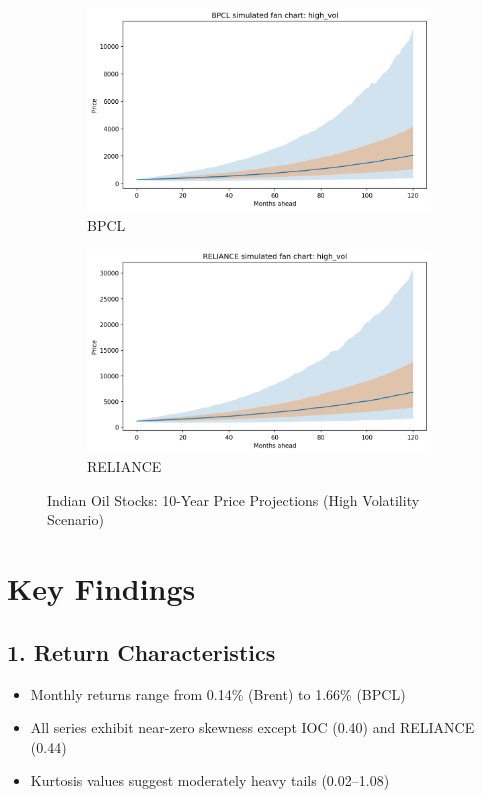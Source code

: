 \documentclass[11pt]{article}
\begin{document}
\begin{figure}[htbp]
\begin{subfigure}{0.48\textwidth}
    \includegraphics[width=\textwidth]{fan_BPCL_high_vol.png}
    \caption{BPCL}
\end{subfigure}
\hfill
\begin{subfigure}{0.48\textwidth}
    \includegraphics[width=\textwidth]{fan_RELIANCE_high_vol.png}
    \caption{RELIANCE}
\end{subfigure}

\caption{Indian Oil Stocks: 10-Year Price Projections (High Volatility Scenario)}
\label{fig:fan_stocks}
\end{figure}

\clearpage
\section*{Key Findings}

\subsection*{1. Return Characteristics}
\begin{itemize}
    \item Monthly returns range from 0.14\% (Brent) to 1.66\% (BPCL)
    \item All series exhibit near-zero skewness except IOC (0.40) and RELIANCE (0.44)
    \item Kurtosis values suggest moderately heavy tails (0.02--1.08)
\end{itemize}
\end{document}
